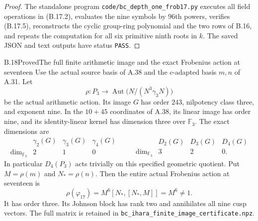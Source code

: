 \begin{proof}
The standalone program
\texttt{code/bc\_depth\_one\_frob17.py} executes
all field operations in (B.17.2), evaluates the nine
symbols by $96$th powers, verifies (B.17.5),
reconstructs the cyclic group-ring polynomial and
the two rows of B.16, and repeats the computation
for all six primitive ninth roots in $k$.
The saved JSON and text outputs have status
\texttt{PASS}.
\end{proof}

\begin{statement}{B.18}{Proved}{The full finite arithmetic image and the exact Frobenius action at seventeen}
Use the actual source basis of A.38 and the
$c$-adapted basis $m,n$ of A.31. Let
\[
 \rho:P_3\longrightarrow
 \operatorname{Aut}\bigl(N/(N^3\gamma_3N)\bigr)
\]
be the actual arithmetic action. Its image $G$
has order $243$, nilpotency class three, and
exponent nine. In the $10+45$ coordinates of A.38,
its linear image has order nine, and its
identity-linear kernel has dimension three over
$\mathbb F_3$. The exact dimensions are
\[
 \begin{array}{c|ccc}
   &\gamma_2(G)&\gamma_3(G)&\gamma_4(G)\\\hline
 \dim_{\mathbb F_3}&2&1&0
 \end{array}
 \qquad
 \begin{array}{c|ccc}
   &D_2(G)&D_3(G)&D_4(G)\\\hline
 \dim_{\mathbb F_3}&3&2&0.
 \end{array}
                                                               \tag{B.18.1}
\]
In particular $D_4(P_3)$ acts trivially on this
specified geometric quotient. Put
$M=\rho(m)$ and $N_*=\rho(n)$. Then the entire
actual Frobenius action at seventeen is
\[
 \rho(\varphi_{17})
   =M^6[N_*,[N_*,M]]=M^6\ne1.
                                                               \tag{B.18.2}
\]
It has order three. Its Johnson block has rank two
and annihilates all nine cusp vectors. The full
matrix is retained in
\texttt{bc\_ihara\_finite\_image\_certificate.npz}.
\end{statement}

